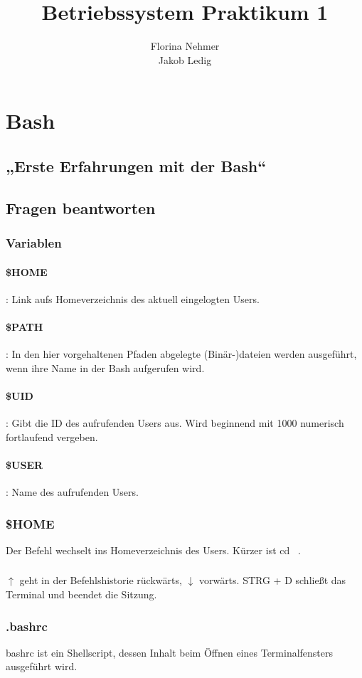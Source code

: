 \documentclass[]{article}
\title{Betriebssystem Praktikum 1}
\author{Florina Nehmer\\
Jakob Ledig}
\begin{document}
\maketitle

\section{Bash}
\subsection{„Erste Erfahrungen mit der Bash“}

\subsection{Fragen beantworten}
\subsubsection{Variablen}
\paragraph{\$HOME}: Link aufs Homeverzeichnis des aktuell eingelogten Users.
\paragraph{\$PATH}: In den hier vorgehaltenen Pfaden abgelegte (Binär-)dateien werden ausgeführt, wenn ihre Name in der Bash aufgerufen wird.
\paragraph{\$UID}: Gibt die ID des aufrufenden Users aus. Wird beginnend mit 1000 numerisch fortlaufend vergeben.
\paragraph{\$USER}: Name des aufrufenden Users.

\subsubsection{\$HOME}
Der Befehl wechselt ins Homeverzeichnis des Users. Kürzer ist cd ~.

\subsubsection{}
$\uparrow$ geht in der Befehlshistorie rückwärts, $\downarrow$ vorwärts. STRG + D schließt das Terminal und beendet die Sitzung.

\subsubsection{.bashrc}
bashrc ist ein Shellscript, dessen Inhalt beim Öffnen eines Terminalfensters ausgeführt wird.
\end{document}
